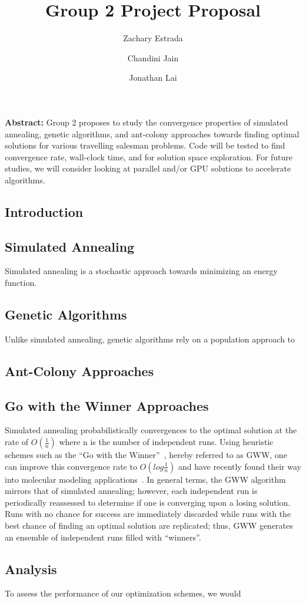 \documentclass[12pt,onecolumn,notitlepage]{article}
\title{Group 2 Project Proposal}
\author{Zachary Estrada \and Chandini Jain \and Jonathan Lai}
\begin{document}
\maketitle


\textbf{Abstract:} Group 2 proposes to study the convergence
properties of simulated annealing, genetic algorithms, and ant-colony approaches towards
finding optimal solutions for various travelling salesman problems.  Code will be tested
to find convergence rate, wall-clock time, and for solution space exploration.  For future studies,
we will consider looking at parallel and/or GPU solutions to accelerate algorithms.

\subsection{Introduction}


\subsection{Simulated Annealing}
Simulated annealing is a stochastic approach towards minimizing an energy function.

\subsection{Genetic Algorithms}
Unlike simulated annealing, genetic algorithms rely on a population approach to 

\subsection{Ant-Colony Approaches}

\subsection{Go with the Winner Approaches}
Simulated annealing probabilistically convergences to the optimal solution at the rate
 of $O(\frac{1}{n})$ where n is the number of independent runs.  
Using heuristic schemes such as the ``Go with the Winner''~\cite{Aldous1994gwt}, hereby referred to as GWW, 
one can improve this convergence rate to $O(log \frac{1}{n})$ and have recently found their way into molecular modeling applications~\cite{Peinado1997gwt}.  In general terms, the GWW algorithm mirrors that of simulated annealing; however, each independent run is periodically reassessed to determine if one is converging upon a losing solution.  Runs with 
no chance for success are immediately discarded while runs with the best chance of finding an optimal solution
are replicated; thus, GWW generates an ensemble of independent runs filled with  ``winners''.  

\subsection{Analysis}
To assess the performance of our optimization schemes, we would




\end{document}
